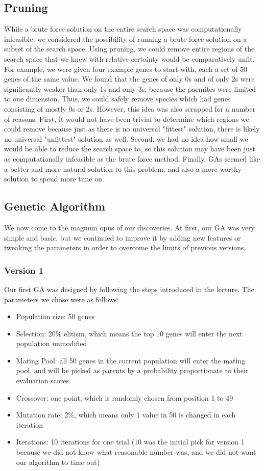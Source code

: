 \documentclass[twoside]{article}
\begin{document}
\begin{multicols}{2}
\subsection{Pruning}
While a brute force solution on the entire search space was computationally infeasible, we considered the possibility of running a brute force solution on a subset of the search space. Using pruning, we could remove entire regions of the search space that we knew with relative certainty would be comparatively unfit. For example, we were given four example genes to start with, each a set of 50 genes of the same value. We found that the genes of only 0s and of only 2s were significantly weaker than only 1s and only 3s, because the pacmites were limited to one dimension. Thus, we could safely remove species which had genes consisting of mostly 0s or 2s. However, this idea was also scrapped for a number of reasons. First, it would not have been trivial to determine which regions we could remove because just as there is no universal "fittest" solution, there is likely no universal "unfittest" solution as well. Second, we had no idea how small we would be able to reduce the search space to, so this solution may have been just as computationally infeasible as the brute force method. Finally, GAs seemed like a better and more natural solution to this problem, and also a more worthy solution to spend more time on.
\subsection{Genetic Algorithm}
We now come to the magnum opus of our discoveries. At first, our GA was very simple and basic, but we continued to improve it by adding new features or tweaking the parameters in order to overcome the limits of previous versions.

\subsubsection{Version 1}
Our first GA was designed by following the steps introduced in the lecture. The parameters we chose were as follows:
\begin{itemize}
	\item Population size: 50 genes
	\item Selection: 20\% elitism, which means the top 10 genes will enter the next population unmodified
	\item Mating Pool: all 50 genes in the current population will enter the mating pool, and will be picked as parents by a probability proportionate to their evaluation scores
	\item Crossover: one point, which is randomly chosen from position 1 to 49
	\item Mutation rate: 2\%, which means only 1 value in 50 is changed in each iteration
	\item Iterations: 10 iterations for one trial (10 was the initial pick for version 1 because we did not know what reasonable number was, and we did not want our algorithm to time out)
\end{itemize}


\end{multicols}
\end{document}
